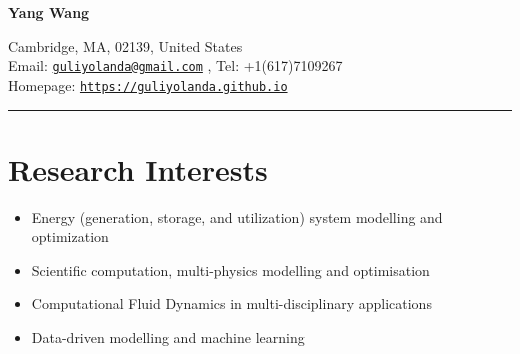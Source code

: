 \documentclass[letterpaper]{article}
\def\name{Yang Wang}
\begin{document}

\centerline{\LARGE \bf \name}


\begin{minipage}{\linewidth}
\begin{center}
Cambridge, MA, 02139, United States\\
Email: \href{mailto:guliyolanda@gmail.com}{\tt guliyolanda@gmail.com} , Tel: +1(617)7109267 \\
Homepage:  \href{https://guliyolanda.github.io}{\tt https://guliyolanda.github.io} \\
\end{center}
\end{minipage}

\vspace{0pt}
\rule{\textwidth}{1pt}

\vspace{-12pt}
\section*{Research Interests}
\vspace{-10pt}
\begin{itemize}
\item Energy (generation, storage, and utilization) system modelling and optimization
\item Scientific computation, multi-physics modelling and optimisation
\item Computational Fluid Dynamics in multi-disciplinary applications
\item Data-driven modelling and machine learning 

\end{itemize}

\vspace{-12pt}
\end{document}
